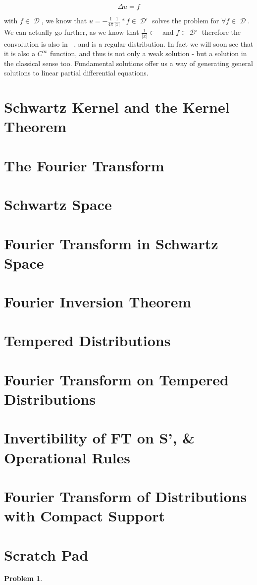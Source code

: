 \documentclass[12pt, a4]{article}
\newtheorem{problem}[theorem]{Problem}
\DeclareMathOperator\tfspaceD{\mathcal{D}}
\DeclareMathOperator\dist{\mathcal{D'}}
\DeclareMathOperator\lone{L_{\text{loc}}^1}
\begin{document}
\begin{equation}
    \Delta u = f
\end{equation}

with $f \in \tfspaceD$, we know that $u = -\frac{1}{4\pi}\frac{1}{|x|} * f \in \dist$ solves the problem for $\forall f \in \tfspaceD$. We can actually go further, as we know that $\frac{1}{|x|} \in \lone$ and $f \in \dist$ therefore the convolution is also in $\lone$, and is a regular distribution. In fact we will soon see that it is also a $C^\infty$ function, and thus is not only a weak solution - but a solution in the classical sense too. Fundamental solutions offer us a way of generating general solutions to linear partial differential equations.

\section{Schwartz Kernel and the Kernel Theorem}

\section{The Fourier Transform}

\section{Schwartz Space}

\section{Fourier Transform in Schwartz Space}

\section{Fourier Inversion Theorem}

\section{Tempered Distributions}

\section{Fourier Transform on Tempered Distributions}

\section{Invertibility of FT on S', \& Operational Rules}

\section{Fourier Transform of Distributions with Compact Support}

\section{Scratch Pad}

\begin{problem}

\end{problem}
\end{document}
